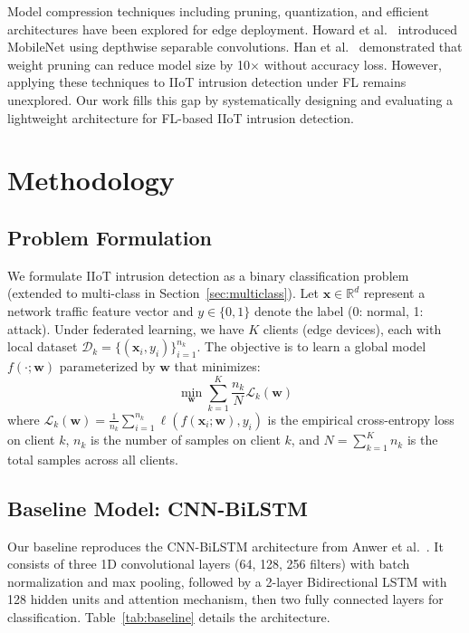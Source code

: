 \documentclass[a4paper,fleqn]{cas-sc}
\begin{document}
Model compression techniques including pruning, quantization, and efficient architectures have been explored for edge deployment. Howard et al.~\cite{howard2017mobilenets} introduced MobileNet using depthwise separable convolutions. Han et al.~\cite{han2016deep} demonstrated that weight pruning can reduce model size by 10$\times$ without accuracy loss. However, applying these techniques to IIoT intrusion detection under FL remains unexplored. Our work fills this gap by systematically designing and evaluating a lightweight architecture for FL-based IIoT intrusion detection.

\section{Methodology}
\label{sec:method}

\subsection{Problem Formulation}
\label{sec:problem}

We formulate IIoT intrusion detection as a binary classification problem (extended to multi-class in Section~\ref{sec:multiclass}). Let $\mathbf{x} \in \mathbb{R}^d$ represent a network traffic feature vector and $y \in \{0, 1\}$ denote the label (0: normal, 1: attack). Under federated learning, we have $K$ clients (edge devices), each with local dataset $\mathcal{D}_k = \{(\mathbf{x}_i, y_i)\}_{i=1}^{n_k}$. The objective is to learn a global model $f(\cdot; \mathbf{w})$ parameterized by $\mathbf{w}$ that minimizes:
\begin{equation}
\min_{\mathbf{w}} \sum_{k=1}^{K} \frac{n_k}{N} \mathcal{L}_k(\mathbf{w})
\label{eq:fl_objective}
\end{equation}
where $\mathcal{L}_k(\mathbf{w}) = \frac{1}{n_k} \sum_{i=1}^{n_k} \ell(f(\mathbf{x}_i; \mathbf{w}), y_i)$ is the empirical cross-entropy loss on client $k$, $n_k$ is the number of samples on client $k$, and $N = \sum_{k=1}^{K} n_k$ is the total samples across all clients.

\subsection{Baseline Model: CNN-BiLSTM}
\label{sec:baseline}

Our baseline reproduces the CNN-BiLSTM architecture from Anwer et al.~\cite{anwer2025advanced}. It consists of three 1D convolutional layers (64, 128, 256 filters) with batch normalization and max pooling, followed by a 2-layer Bidirectional LSTM with 128 hidden units and attention mechanism, then two fully connected layers for classification. Table~\ref{tab:baseline} details the architecture.
\end{document}
